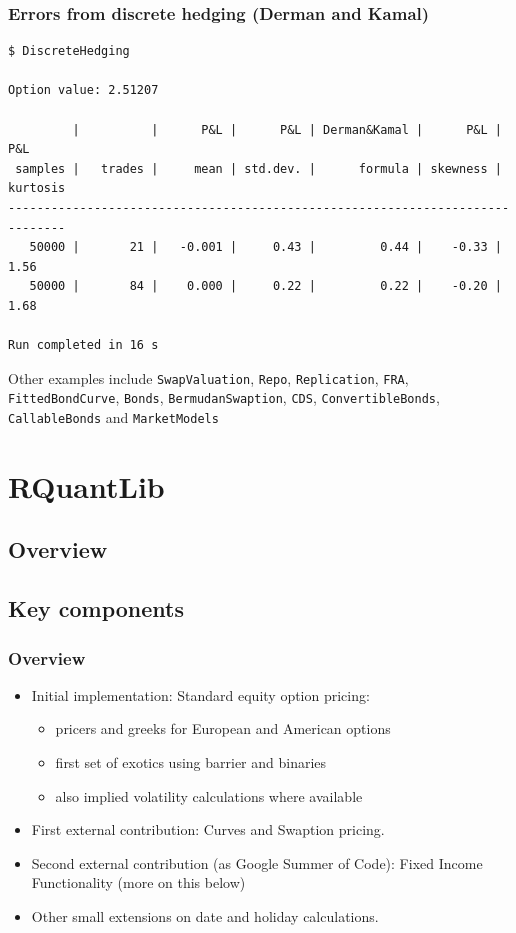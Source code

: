 \documentclass[compress]{beamer}
\begin{document}
\begin{frame}[fragile]
  \frametitle{Errors from discrete hedging (Derman and Kamal)}
  { \tiny
\begin{verbatim}
$ DiscreteHedging

Option value: 2.51207

         |          |      P&L |      P&L | Derman&Kamal |      P&L |      P&L
 samples |   trades |     mean | std.dev. |      formula | skewness | kurtosis
------------------------------------------------------------------------------
   50000 |       21 |   -0.001 |     0.43 |         0.44 |    -0.33 |     1.56
   50000 |       84 |    0.000 |     0.22 |         0.22 |    -0.20 |     1.68

Run completed in 16 s
  \end{verbatim}
  }

  \pause
  Other examples include \texttt{SwapValuation}, \texttt{Repo},
  \texttt{Replication}, \texttt{FRA}, \texttt{FittedBondCurve}, \texttt{Bonds},
  \texttt{BermudanSwaption}, \texttt{CDS}, \texttt{ConvertibleBonds},
  \texttt{CallableBonds} and \texttt{MarketModels}

\end{frame}

\section{RQuantLib}
\subsection{Overview}
\subsection{Key components}
\begin{frame}
  \frametitle{Overview}
  \begin{itemize}[<+-|alert@+>]
  \item Initial implementation: Standard equity option pricing:
    \begin{itemize}[<+-|alert@+>]
      \item pricers and greeks for European and American options
      \item first set of exotics using barrier and binaries
      \item also implied volatility calculations where available
    \end{itemize}
  \item First external contribution: Curves and Swaption pricing.
  \item Second external contribution (as Google Summer of Code): Fixed Income
    Functionality (more on this below)
  \item Other small extensions on date and holiday calculations.
  \end{itemize}
\end{frame}
\end{document}
